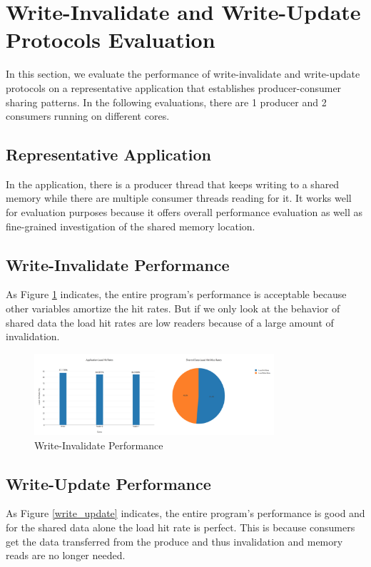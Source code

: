 \documentclass[conference]{IEEEtran}
\begin{document}
\newpage

\section{Write-Invalidate and Write-Update Protocols Evaluation}
In this section, we evaluate the performance of write-invalidate and write-update protocols on a representative application that establishes producer-consumer sharing patterns. In the following evaluations, there are 1 producer and 2 consumers running on different cores.

\subsection{Representative Application}
In the application, there is a producer thread that keeps writing to a shared memory while there are multiple consumer threads reading for it. It works well for evaluation purposes because it offers overall performance evaluation as well as fine-grained investigation of the shared memory location.

\subsection{Write-Invalidate Performance}
As Figure \ref{write_invalidate} indicates, the entire program’s performance is acceptable because other variables amortize the hit rates. But if we only look at the behavior of shared data the load hit rates are low readers because of a large amount of invalidation.

\begin{figure}[!h]
\centering
\includegraphics[width=3.5in]{write_invalidate.png}
\caption{Write-Invalidate Performance}
\label{write_invalidate}
\end{figure}
\FloatBarrier

\subsection{Write-Update Performance}
As Figure \ref{write_update} indicates, the entire program’s performance is good and for the shared data alone the load hit rate is perfect. This is because consumers get the data transferred from the produce and thus invalidation and memory reads are no longer needed.
\end{document}
